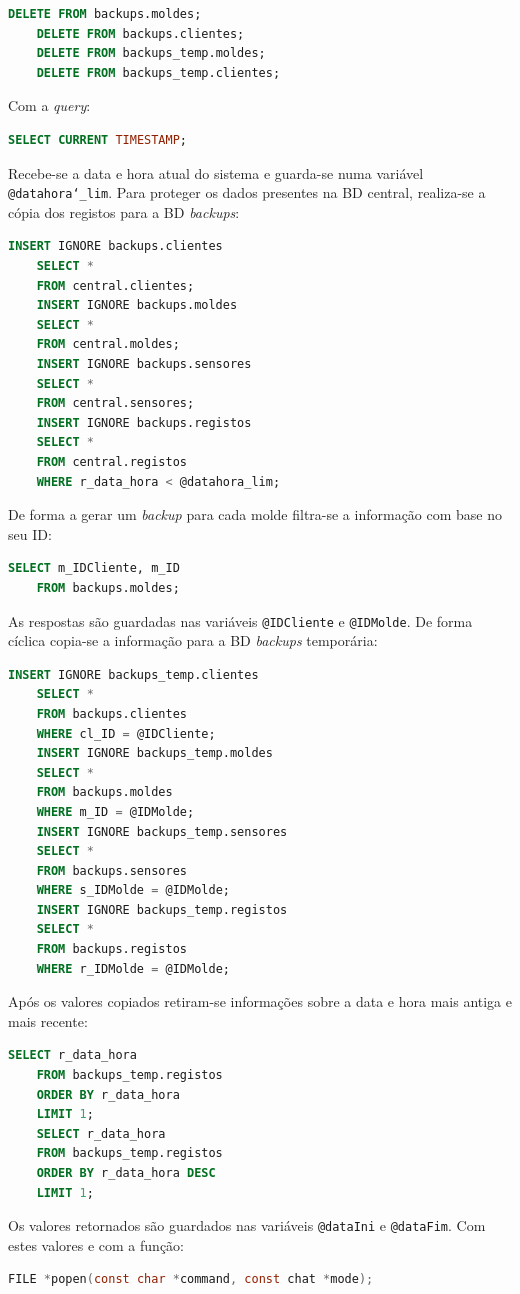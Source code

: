 \documentclass[11pt,twoside,a4paper]{report}
\begin{document}
\begin{lstlisting}[language = SQL]
	DELETE FROM backups.moldes;
	DELETE FROM backups.clientes;
	DELETE FROM backups_temp.moldes;
	DELETE FROM backups_temp.clientes;
\end{lstlisting}
Com a \textit{query}:
\begin{lstlisting}[language = SQL]
	SELECT CURRENT TIMESTAMP;
\end{lstlisting}
Recebe-se a data e hora atual do sistema e guarda-se numa variável \texttt{@datahora\char`_lim}. Para proteger os dados presentes na BD central, realiza-se a cópia dos registos para a BD \textit{backups}:
\begin{lstlisting}[language = SQL]
	INSERT IGNORE backups.clientes
	SELECT *
	FROM central.clientes;
	INSERT IGNORE backups.moldes
	SELECT *
	FROM central.moldes;
	INSERT IGNORE backups.sensores
	SELECT *
	FROM central.sensores;
	INSERT IGNORE backups.registos
	SELECT *
	FROM central.registos
	WHERE r_data_hora < @datahora_lim;
\end{lstlisting}
De forma a gerar um \textit{backup} para cada molde filtra-se a informação com base no seu ID:
\begin{lstlisting}[language = SQL]
	SELECT m_IDCliente, m_ID
	FROM backups.moldes;
\end{lstlisting}
As respostas são guardadas nas variáveis \texttt{@IDCliente} e \texttt{@IDMolde}. De forma cíclica copia-se a informação para a BD \textit{backups} temporária:
\begin{lstlisting}[language = SQL]
	INSERT IGNORE backups_temp.clientes
	SELECT *
	FROM backups.clientes
	WHERE cl_ID = @IDCliente;
	INSERT IGNORE backups_temp.moldes
	SELECT *
	FROM backups.moldes
	WHERE m_ID = @IDMolde;
	INSERT IGNORE backups_temp.sensores
	SELECT *
	FROM backups.sensores
	WHERE s_IDMolde = @IDMolde;
	INSERT IGNORE backups_temp.registos
	SELECT *
	FROM backups.registos
	WHERE r_IDMolde = @IDMolde;
\end{lstlisting}
Após os valores copiados retiram-se informações sobre a data e hora mais antiga e mais recente:
\begin{lstlisting}[language = SQL]
	SELECT r_data_hora
	FROM backups_temp.registos
	ORDER BY r_data_hora
	LIMIT 1;
	SELECT r_data_hora
	FROM backups_temp.registos
	ORDER BY r_data_hora DESC
	LIMIT 1;
\end{lstlisting}
Os valores retornados são guardados nas variáveis \texttt{@dataIni} e \texttt{@dataFim}. Com estes valores e com a função:
\begin{lstlisting}[language = C]
	FILE *popen(const char *command, const chat *mode);
\end{lstlisting}
\end{document}
